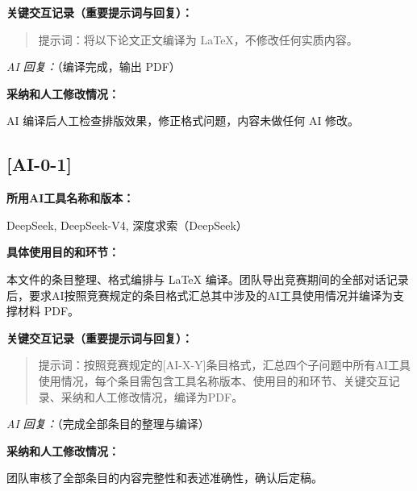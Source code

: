 \documentclass[12pt,a4paper]{ctexart}
\begin{document}
\textbf{关键交互记录（重要提示词与回复）：}\par

\begin{quote}
提示词：将以下论文正文编译为 LaTeX，不修改任何实质内容。
\end{quote}

\textit{AI 回复：}（编译完成，输出 PDF）

\textbf{采纳和人工修改情况：}\par
AI 编译后人工检查排版效果，修正格式问题，内容未做任何 AI 修改。

\subsection*{[AI-0-1]}

\textbf{所用AI工具名称和版本：}\par
DeepSeek, DeepSeek-V4, 深度求索（DeepSeek）

\textbf{具体使用目的和环节：}\par
本文件的条目整理、格式编排与 LaTeX 编译。团队导出竞赛期间的全部对话记录后，要求AI按照竞赛规定的条目格式汇总其中涉及的AI工具使用情况并编译为支撑材料 PDF。

\textbf{关键交互记录（重要提示词与回复）：}\par

\begin{quote}
提示词：按照竞赛规定的[AI-X-Y]条目格式，汇总四个子问题中所有AI工具使用情况，每个条目需包含工具名称版本、使用目的和环节、关键交互记录、采纳和人工修改情况，编译为PDF。
\end{quote}

\textit{AI 回复：}（完成全部条目的整理与编译）

\textbf{采纳和人工修改情况：}\par
团队审核了全部条目的内容完整性和表述准确性，确认后定稿。
\end{document}
